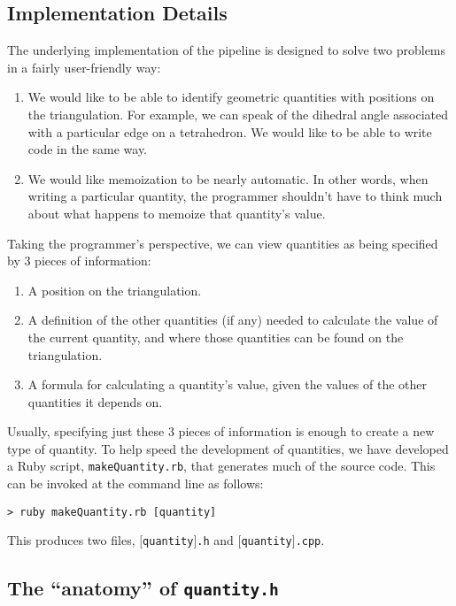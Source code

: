 \documentclass[10pt]{article}%
\begin{document}
\subsection*{Implementation Details}

The underlying implementation of the pipeline is designed to solve two problems in a fairly user-friendly way:
\begin{enumerate}
\item  We would like to be able to identify geometric quantities with positions on the triangulation. For example, we can speak of the dihedral angle associated with a particular edge on a tetrahedron. We would like to be able to write code in the same way.
\item  We would like memoization to be nearly automatic. In other words, when writing a particular quantity, the programmer shouldn't have to think much about what happens to memoize that quantity's value.
\end{enumerate}
\begin{quotation} \end{quotation}Taking the programmer's perspective, we can view quantities as being specified by 3 pieces of information:
\begin{enumerate}
\item  A position on the triangulation.
\item  A definition of the other quantities (if any) needed to calculate the value of the current quantity, and where those quantities can be found on the triangulation.
\item  A formula for calculating a quantity's value, given the values of the other quantities it depends on.
\end{enumerate}
Usually, specifying just these 3 pieces of information is enough to create a new type of quantity. To help speed the development of quantities, we have developed a Ruby script, \texttt{makeQuantity.rb}, that generates much of the source code. This can be invoked at the command line as follows:
{\small{\begin{verbatim} 
> ruby makeQuantity.rb [quantity]
\end{verbatim}
}}
This produces two files, \texttt{\mbox{$[$}quantity\mbox{$]$}.h} and \texttt{\mbox{$[$}quantity\mbox{$]$}.cpp}.

\subsection{The ``anatomy'' of \texttt{quantity.h}}
\end{document}
